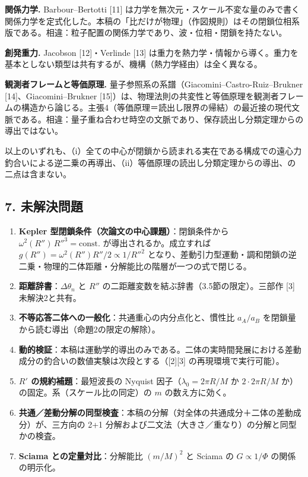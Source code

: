 \documentclass[
  a4paper,
]{ltjsarticle}
\providecommand{\tightlist}{%
  \setlength{\itemsep}{0pt}\setlength{\parskip}{0pt}}
\begin{document}
\textbf{関係力学.} Barbour--Bertotti {[}11{]}
は力学を無次元・スケール不変な量のみで書く関係力学を定式化した。本稿の「比だけが物理」（作図規則）はその閉鎖位相系版である。相違：粒子配置の関係力学であり、波・位相・閉鎖を持たない。

\textbf{創発重力.} Jacobson {[}12{]}・Verlinde {[}13{]}
は重力を熱力学・情報から導く。重力を基本としない類型は共有するが、機構（熱力学経由）は全く異なる。

\textbf{観測者フレームと等価原理.}
量子参照系の系譜（Giacomini--Castro-Ruiz--Brukner
{[}14{]}、Giacomini--Brukner
{[}15{]}）は、物理法則の共変性と等価原理を観測者フレームの構造から論じる。主張4（等価原理＝読出し限界の帰結）の最近接の現代文脈である。相違：量子重ね合わせ時空の文脈であり、保存読出し分類定理からの導出ではない。

以上のいずれも、（i）全ての中心が閉鎖から読まれる実在である構成での遠心力釣合いによる逆二乗の再導出、（ii）等価原理の読出し分類定理からの導出、の二点は含まない。

\subsection{7. 未解決問題}\label{ux672aux89e3ux6c7aux554fux984c}

\begin{enumerate}
\def\labelenumi{\arabic{enumi}.}
\tightlist
\item
  \textbf{Kepler 型閉鎖条件（次論文の中心課題）}：閉鎖条件から
  \(\omega^2(R'')\,R''^3=\text{const.}\) が導出されるか。成立すれば
  \(g(R'')=\omega^2(R'')R''/2\propto1/R''^2\)
  となり、差動引力型運動・調和閉鎖の逆二乗・物理的二体距離・分解能比の階層が一つの式で閉じる。
\item
  \textbf{距離辞書}：\(\Delta\theta_n\) と \(R''\)
  の二距離変数を結ぶ辞書（3.5節の限定）。三部作 {[}3{]} 未解決2と共有。
\item
  \textbf{不等応答二体への一般化}：共通重心の内分点化と、慣性比
  \(a_A/a_B\) を閉鎖量から読む導出（命題2の限定の解除）。
\item
  \textbf{動的検証}：本稿は運動学的導出のみである。二体の実時間発展における差動成分の釣合いの数値実験は次段とする（{[}2{]}{[}3{]}
  の再現環境で実行可能）。
\item
  \textbf{\(R'\) の規約補題}：最短波長の Nyquist
  因子（\(\lambda_0=2\pi R/M\) か \(2\cdot2\pi R/M\)
  か）の固定。系（スケール比の同定）の \(m\) の数え方に効く。
\item
  \textbf{共通／差動分解の同型検査}：本稿の分解（対全体の共通成分＋二体の差動成分）が、三方向の
  2+1 分解および二文法（大きさ／重なり）の分解と同型かの検査。
\item
  \textbf{Sciama との定量対比}：分解能比 \((m/M)^2\) と Sciama の
  \(G\propto1/\Phi\) の関係の明示化。
\end{enumerate}
\end{document}

